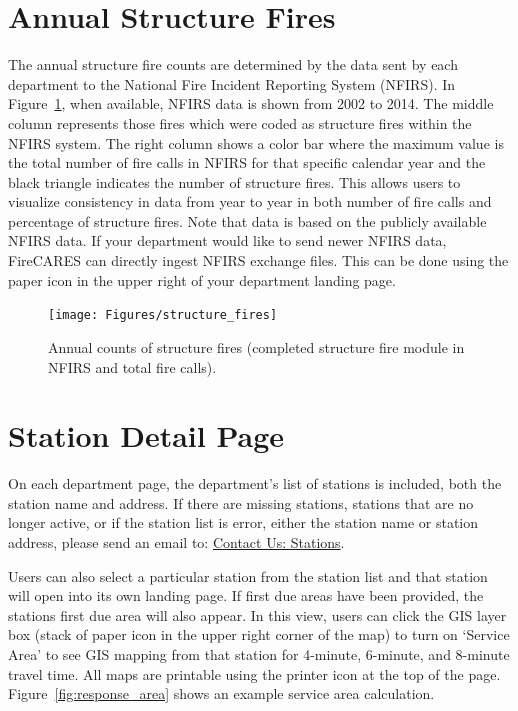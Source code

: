 \documentclass[12pt,oneside]{book}
\begin{document}
\FloatBarrier

\section{Annual Structure Fires}

The annual structure fire counts are determined by the data sent by each department to the National Fire Incident Reporting System (NFIRS). In Figure~\ref{fig:structure_fires}, when available, NFIRS data is shown from 2002 to 2014. The middle column represents those fires which were coded as structure fires within the NFIRS system. The right column shows a color bar where the maximum value is the total number of fire calls in NFIRS for that specific calendar year and the black triangle indicates the number of structure fires. This allows users to visualize consistency in data from year to year in both number of fire calls and percentage of structure fires. Note that data is based on the publicly available NFIRS data. If your department would like to send newer NFIRS data, FireCARES can directly ingest NFIRS exchange files. This can be done using the paper icon in the upper right of your department landing page. 

\begin{figure}[ht!]
\centering
\texttt{[image: Figures/structure\_fires]}
\caption{Annual counts of structure fires (completed structure fire module in NFIRS and total fire calls).}
\label{fig:structure_fires}
\end{figure}

\section{Station Detail Page}

On each department page, the department's list of stations is included, both the station name and address. If there are missing stations, stations that are no longer active, or if the station list is error, either the station name or station address, please send an email to: \href{mailto:boundaries@firecares.org}{Contact Us: Stations}.

Users can also select a particular station from the station list and that station will open into its own landing page. If first due areas have been provided, the stations first due area will also appear. In this view, users can click the GIS layer box (stack of paper icon in the upper right corner of the map) to turn on `Service Area' to see GIS mapping from that station for 4-minute, 6-minute, and 8-minute travel time. All maps are printable using the printer icon at the top of the page. Figure~\ref{fig:response_area} shows an example service area calculation.
\end{document}
